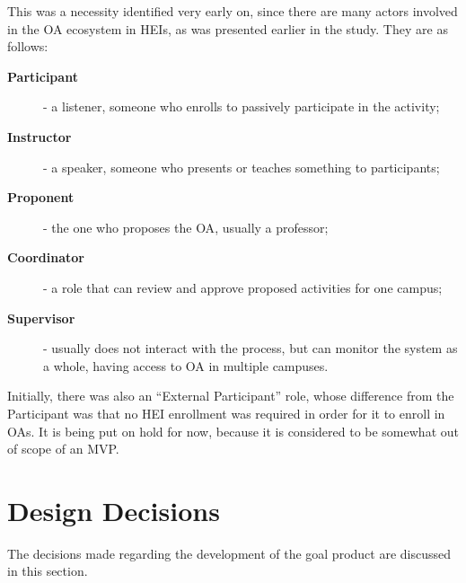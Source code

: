 This was a necessity identified very early on, since there are many actors involved in the \ac{OA} ecosystem in \acp{HEI}, as was presented earlier in the study. They are as follows:
\begin{description}
  \item[\textbf{Participant}] - a listener, someone who enrolls to passively participate in the activity;
  \item[\textbf{Instructor}] - a speaker, someone who presents or teaches something to participants;
  \item[\textbf{Proponent}] - the one who proposes the \ac{OA}, usually a professor;
  \item[\textbf{Coordinator}] - a role that can review and approve proposed activities for one campus;
  \item[\textbf{Supervisor}] - usually does not interact with the process, but can monitor the system as a whole, having access to \ac{OA} in multiple campuses.
\end{description}
Initially, there was also an ``External Participant'' role, whose difference from the Participant was that no \ac{HEI} enrollment was required in order for it to enroll in \acp{OA}. It is being put on hold for now, because it is considered to be somewhat out of scope of an \ac{MVP}.

\section{Design Decisions}\label{ext:design-decisions}

The decisions made regarding the development of the goal product are discussed in this section.

